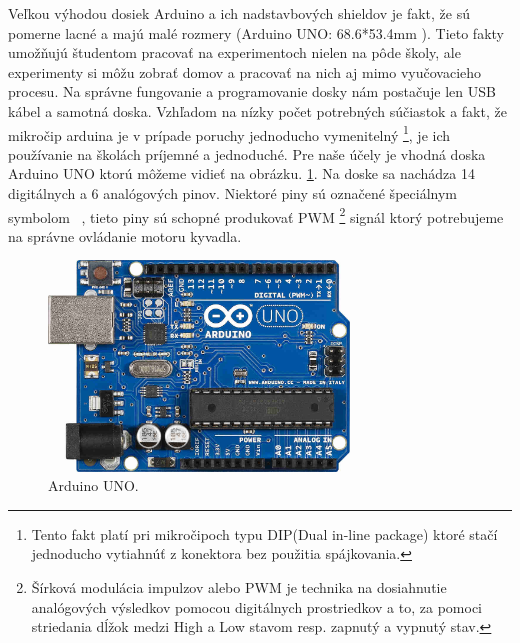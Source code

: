 Veľkou výhodou dosiek Arduino a ich nadstavbových shieldov je fakt, že sú pomerne lacné a majú malé rozmery (Arduino UNO: 68.6*53.4mm \cite{UNO} ). Tieto fakty umožňujú študentom pracovať na experimentoch nielen na pôde školy, ale experimenty si môžu zobrať domov a pracovať na nich aj mimo vyučovacieho procesu. Na správne fungovanie a programovanie dosky nám postačuje len USB kábel a samotná doska. Vzhľadom na nízky počet potrebných súčiastok a fakt, že mikročip arduina je v prípade poruchy jednoducho vymenitelný \footnote[2]{Tento fakt platí pri mikročipoch typu DIP(Dual in-line package) ktoré stačí jednoducho vytiahnúť z konektora bez použitia spájkovania.}, je ich používanie na školách príjemné a jednoduché. Pre naše účely je vhodná doska Arduino UNO ktorú môžeme vidieť na obrázku. \ref{OBRAZOK 1.3}. Na doske sa nachádza 14 digitálnych a 6 analógových pinov. Niektoré piny sú označené špeciálnym symbolom ~, tieto piny sú schopné produkovať PWM \footnote[3]{Šírková modulácia impulzov alebo PWM je technika na dosiahnutie analógových výsledkov pomocou digitálnych prostriedkov a to, za pomoci striedania dĺžok medzi High a Low stavom resp. zapnutý a vypnutý stav.} signál ktorý potrebujeme na správne ovládanie motoru kyvadla.

\begin{figure}[!tbh]
\centering
\includegraphics[width=80mm]{obr/arduino.jpg}
\caption{Arduino UNO.}\label{OBRAZOK 1.3}
\end{figure}




